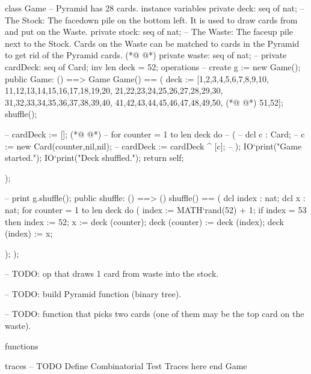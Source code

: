 \begin{vdmpp}[breaklines=true]
class Game
-- Pyramid has 28 cards.
instance variables
  private deck: seq of nat;
  -- The Stock: The facedown pile on the bottom left. It is used to draw cards from and put on the Waste.
  private stock: seq of nat;
  -- The Waste: The faceup pile next to the Stock. Cards on the Waste can be matched to cards in the Pyramid to get rid of the Pyramid cards.
(*@
\label{Game:8}
@*)
  private waste: seq of nat;
  -- private cardDeck: seq of Card;
  inv len deck = 52;
operations
    -- create g := new Game();
  public Game: () ==> Game
  Game() == 
  (
   deck := [1,2,3,4,5,6,7,8,9,10,
   11,12,13,14,15,16,17,18,19,20,
   21,22,23,24,25,26,27,28,29,30,
   31,32,33,34,35,36,37,38,39,40,
   41,42,43,44,45,46,47,48,49,50,
(*@
\label{pop:21}
@*)
   51,52];
   shuffle();
   
   -- cardDeck := [];
(*@
\label{shuffle:25}
@*)
     -- for counter = 1 to len deck do
     -- (
     --  dcl c : Card;
     -- c := new Card(counter,nil,nil);
     --  cardDeck := cardDeck ^ [c];    
   -- );
   IO`print("Game started.\n");
   IO`print("Deck shuffled.\n");
   return self;
   
  );

    
    -- print g.shuffle();
    public shuffle: () ==> ()
    shuffle() == (
     dcl index  : nat;
     dcl x : nat;
     for counter = 1 to len deck do
     (
       index  := MATH`rand(52) + 1;
       if index = 53 then index := 52;
       x := deck (counter);
       deck (counter) := deck (index);
       deck (index) := x;
      
   );
    );
    
    -- TODO: op that draws 1 card from waste into the stock.
    
    -- TODO: build Pyramid function (binary tree).
    
    -- TODO: function that picks two cards (one of them may be the top card on the waste).


functions

traces
-- TODO Define Combinatorial Test Traces here
end Game
\end{vdmpp}
